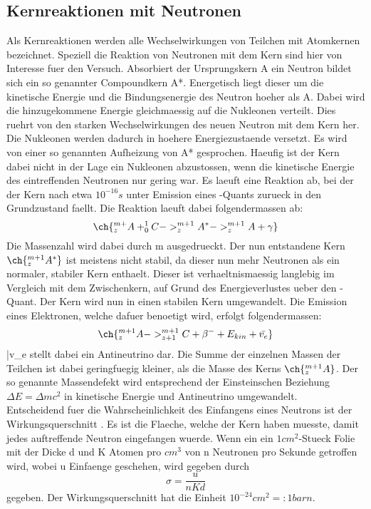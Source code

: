 \documentclass[titlepage=firstcover, captions=tableheading]{scrartcl}
\let\ce\ch
\begin{document}
\subsection{Kernreaktionen mit Neutronen}
Als Kernreaktionen werden alle Wechselwirkungen von Teilchen mit Atomkernen bezeichnet. Speziell die Reaktion von Neutronen mit dem Kern sind hier von Interesse fuer den Versuch. Absorbiert der Ursprungskern A ein Neutron bildet sich ein so genannter Compoundkern A*. Energetisch liegt dieser um die kinetische Energie und die Bindungsenergie des Neutron hoeher als A. Dabei wird die hinzugekommene Energie gleichmaessig auf die Nukleonen verteilt. Dies ruehrt von den starken Wechselwirkungen des neuen Neutron mit dem Kern her. Die Nukleonen werden dadurch in hoehere Energiezustaende versetzt. Es wird von einer so genannten Aufheizung von A* gesprochen. Haeufig ist der Kern dabei nicht in der Lage ein Nukleonen abzustossen, wenn die kinetische Energie des eintreffenden Neutronen nur gering war. Es laeuft eine Reaktion ab, bei der der Kern nach etwa $10^{-16}s$ unter Emission eines \gamma-Quants zurueck in den Grundzustand faellt. Die Reaktion laeuft dabei folgendermassen ab:
\begin{equation}
    \ce{^{m+}_zA + ^{1}_{0}C -> ^{m+1}_zA^{*} -> ^{m+1}_zA + \gamma} \nonumber
\end{equation}
Die Massenzahl wird dabei durch m ausgedrueckt. Der nun entstandene Kern $\ce{^{m+1}_{z}A^{*}}$ ist meistens nicht stabil, da dieser nun mehr Neutronen als ein normaler, stabiler Kern enthaelt. Dieser ist verhaeltnismaessig langlebig im Vergleich mit dem Zwischenkern, auf Grund des Energieverlustes ueber den \gamma-Quant. Der Kern wird nun in einen stabilen Kern umgewandelt. Die Emission eines Elektronen, welche dafuer benoetigt wird, erfolgt folgendermassen:
\begin{equation}
    \ce{^{m+1}_zA -> ^{m+1}_{z+1}C + \beta^- + E_{kin}+\bar{v_e}} \nonumber
\end{equation}
\bar{v_e} stellt dabei ein Antineutrino dar. Die Summe der einzelnen Massen der Teilchen ist dabei geringfuegig kleiner, als die Masse des Kerns $\ce{^{m+1}_zA}$. Der so genannte Massendefekt wird entsprechend der Einsteinschen Beziehung $\Delta E= \Delta mc^{2}$ in kinetische Energie und Antineutrino umgewandelt.\\
Entscheidend fuer die Wahrscheinlichkeit des Einfangens eines Neutrons ist der Wirkungsquerschnitt \sigma. Es ist die Flaeche, welche der Kern haben muesste, damit jedes auftreffende Neutron eingefangen wuerde. Wenn ein ein $1cm^2$-Stueck Folie mit der Dicke d und K Atomen pro $cm^3$ von n Neutronen pro Sekunde getroffen wird, wobei u Einfaenge geschehen, wird \sigma gegeben durch
\begin{equation}
    \sigma =\frac{u}{nKd} \nonumber
\end{equation}
gegeben. Der Wirkungsquerschnitt hat die Einheit $10^{-24}cm^2=:1 barn$.
\end{document}
